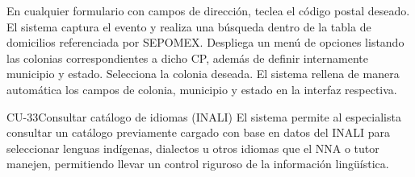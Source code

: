\begin{UCtrayectoria}
	\UCpaso[\UCactor] En cualquier formulario con campos de dirección, teclea el código postal deseado.
	\UCpaso El sistema captura el evento y realiza una búsqueda dentro de la tabla de domicilios referenciada por SEPOMEX.
	\UCpaso Despliega un menú de opciones listando las colonias correspondientes a dicho CP, además de definir internamente municipio y estado. 
	\UCpaso[\UCactor] Selecciona la colonia deseada.
	\UCpaso El sistema rellena de manera automática los campos de colonia, municipio y estado en la interfaz respectiva.
\end{UCtrayectoria}

\begin{UseCase}{CU-33}{Consultar catálogo de idiomas (INALI)}{
		El sistema permite al especialista consultar un catálogo previamente cargado con base en datos del INALI para seleccionar lenguas indígenas, dialectos u otros idiomas que el NNA o tutor manejen, permitiendo llevar un control riguroso de la información lingüística.
	}
\end{UseCase}
